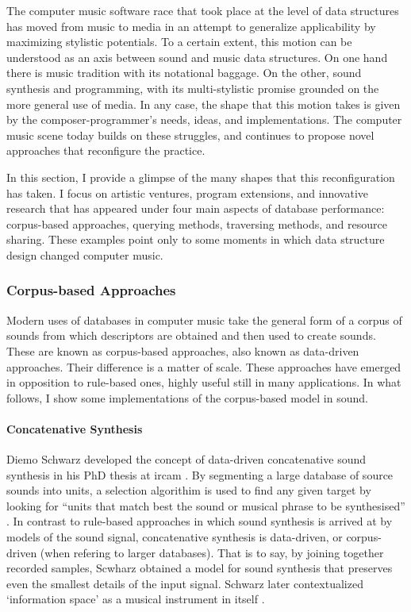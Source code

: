 The computer music software race that took place at the level of data structures has moved from music to media in an attempt to generalize applicability by maximizing stylistic potentials. To a certain extent, this motion can be understood as an axis between sound and music data structures. On one hand there is music tradition with its notational baggage. On the other, sound synthesis and programming, with its multi-stylistic promise grounded on the more general use of media. In any case, the shape that this motion takes is given by the composer-programmer's needs, ideas, and implementations. The computer music scene today builds on these struggles, and continues to propose novel approaches that reconfigure the practice.

In this section, I provide a glimpse of the many shapes that this reconfiguration has taken. I focus on artistic ventures, program extensions, and innovative research that has appeared under four main aspects of database performance: corpus-based approaches, querying methods, traversing methods, and resource sharing. These examples point only to some moments in which data structure design changed computer music.

\subsubsection{Corpus-based Approaches}
Modern uses of databases in computer music take the general form of a corpus of sounds from which descriptors are obtained and then used to create sounds. These are known as corpus-based approaches, also known as data-driven approaches. Their difference is a matter of scale. These approaches have emerged in opposition to rule-based ones, highly useful still in many applications. In what follows, I show some implementations of the corpus-based model in sound.

\paragraph{Concatenative Synthesis}
Diemo Schwarz developed the concept of data-driven concatenative sound synthesis in his PhD thesis at \gls{ircam} \parencites{Schwarz2000}{icmc/bbp2372.2003.099}{Sch06:How}. By segmenting a large database of source sounds into units, a selection algorithim is used to find any given target by looking for ``units that match best the sound or musical phrase to be synthesised'' \parencite{Sch06:How}. In contrast to rule-based approaches in which sound synthesis is arrived at by models of the sound signal, concatenative synthesis is data-driven, or corpus-driven (when refering to larger databases). That is to say, by joining together recorded samples, Scwharz obtained a model for sound synthesis that preserves even the smallest details of the input signal. Schwarz later contextualized `information space' as a musical instrument in itself \parencites{diemo_schwarz_2009_849679}{Schwarz:2012}.

